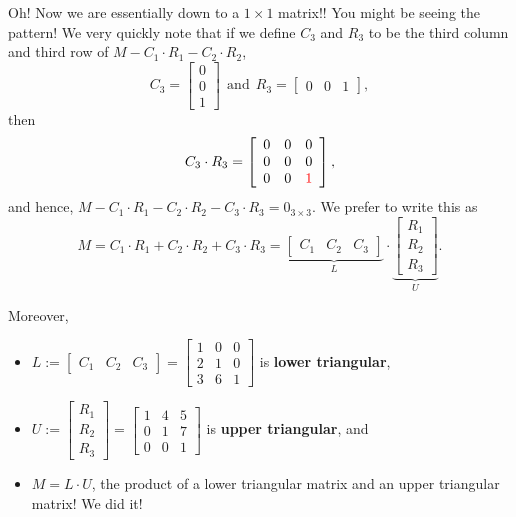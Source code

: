  Oh! Now we are essentially down to a $1 \times 1 $ matrix!!  You might be seeing the pattern! We very quickly note that if we define  
 $C_3$  and $R_3$  to be the third column and third row of $M- C_1 \cdot R_1 - C_2 \cdot R_2$, 
$$C_3=\left[\begin{array}{r} 
    0  \\ 0\\ 1  \end{array}  \right]~~\text{and}~~R_3=\left[\begin{array}{rrr} 
   0   &  0   &  1 \end{array}  \right],  $$
   then 
   $$C_3 \cdot R_3 = \left[\begin{array}{rrr} 
       0  &   0  &   0 \\
     0   &  0   &  0 \\
     0   &  0   & \color{red} 1 \end{array}  \right],
     $$
     and hence, $M - C_1 \cdot R_1 - C_2 \cdot R_2 - C_3 \cdot R_3 = 0_{3 \times 3}$. We prefer to write this as
     $$ \boxed{M = C_1 \cdot R_1 + C_2 \cdot R_2 + C_3 \cdot R_3 = \underbrace{\left[\begin{array}{rrr} 
  C_1   &  C_2   &  C_3\end{array}  \right]}_{L} \cdot \underbrace{\left[\begin{array}{r} 
    R_1  \\ R_2\\ R_3 \end{array}  \right]}_{U}.} $$
    
    Moreover, 
    \begin{itemize}
        \item  $L:=\left[\begin{array}{rrr} 
   C_1   &  C_2   &  C_3\end{array}  \right] = 
   \left[\begin{array}{rrr} 
       1  &   0  &   0 \\
    2  &  1   &  0 \\
     3  &  6   & 1 \end{array}  \right]$ is \textbf{lower triangular}, 
     \item $U:=   \left[\begin{array}{r} 
    R_1 \\ R_2\\ R_3  \end{array}  \right] = \left[\begin{array}{rrr} 
     1  &   4   &  5 \\
     0  &   1   &  7 \\
     0  &   0   &  1 \end{array}  \right]$ is \textbf{upper triangular}, and \\
     \item $M=L \cdot U$, the product of a lower triangular matrix and an upper triangular matrix! We did it!
    \end{itemize}
    
